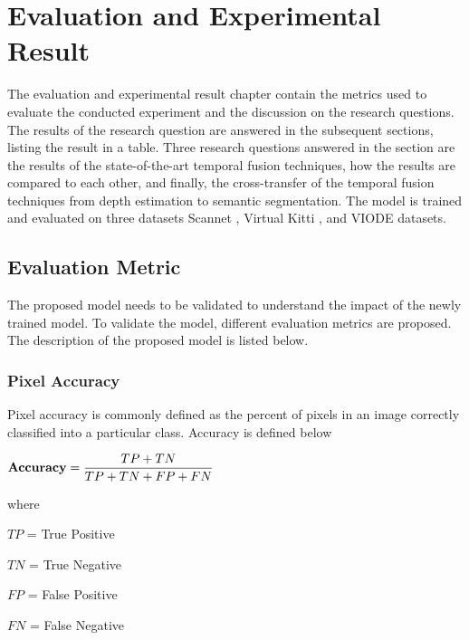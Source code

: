 
\newcommand\scalemath[2]{\scalebox{#1}{\mbox{\ensuremath{\displaystyle #2}}}}



    \chapter{Evaluation and Experimental Result}
	\label{chap:evaluationandresult}
    The evaluation and experimental result chapter contain the metrics used to evaluate the conducted experiment and the discussion on the research questions. The results of the research question are answered in the subsequent sections, listing the result in a table. Three research questions answered in the section are the results of the state-of-the-art temporal fusion techniques, how the results are compared to each other, and finally, the cross-transfer of the temporal fusion techniques from depth estimation to semantic segmentation. The model is trained and evaluated on three datasets Scannet \cite{79_dai2017scannet}, Virtual Kitti \cite{80_cabon2020vkitti2}, and VIODE \cite{81_minodaRAL2021} datasets. 
    
    \section{Evaluation Metric}
    
    The proposed model needs to be validated to understand the impact of the newly trained model. To validate the model, different evaluation metrics are proposed. The description of the proposed model is listed below.
    
    \subsection{Pixel Accuracy}
    
    Pixel accuracy is commonly defined as the percent of pixels in an image correctly classified into a particular class. Accuracy is defined below
    
    
    $
    {\bf Accuracy } = \scalemath{1}{\frac{TP+TN}{TP+TN+FP+FN}}
    $
    
    where
     
    $TP$ = True Positive 
    
    $TN$ = True Negative
    
    $FP$ = False Positive
    
    $FN$ = False Negative
    
